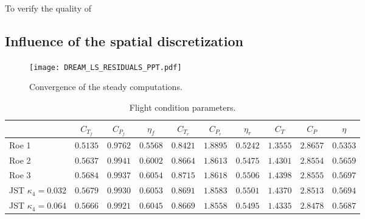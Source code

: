 To verify the quality of 

\subsection{Influence of the spatial discretization} %
\label{sub:dream_ls_spatial_discretization}

\begin{figure}[htb]
  \centering
  \texttt{[image: DREAM\_LS\_RESIDUALS\_PPT.pdf]}
  \caption{Convergence of the steady computations.}
  \label{fig:dream_operating_point}
\end{figure}

\begin{table}[htb]
   \centering
  \begin{tabular}{l|ccccccccc}
    \toprule
    \phantom{abdefghijk}& $C_{T_f}$ & $C_{P_f}$ & $\eta_f$ & $C_{T_r}$ & $C_{P_r}$ & $\eta_r$ & $C_T$ & $C_P$ & $\eta$ \\
    \midrule
    Roe 1 & $0.5135$ & $0.9762$ & $0.5568$ & $0.8421$ & $1.8895$ & $0.5242$ & $1.3555$ & $2.8657$ & $0.5353$ \\
    Roe 2 & $0.5637$ & $0.9941$ & $0.6002$ & $0.8664$ & $1.8613$ & $0.5475$ & $1.4301$ & $2.8554$ & $0.5659$ \\
    Roe 3 & $0.5684$ & $0.9937$ & $0.6054$ & $0.8715$ & $1.8618$ & $0.5506$ & $1.4398$ & $2.8555$ & $0.5697$ \\
    JST $\kappa_4 = 0.032$ & $0.5679$ & $0.9930$ & $0.6053$ & $0.8691$ & $1.8583$ & $0.5501$ & $1.4370$ & $2.8513$ & $0.5694$ \\
    JST $\kappa_4 = 0.064$ & $0.5666$ & $0.9921$ & $0.6045$ & $0.8669$ & $1.8558$ & $0.5495$ & $1.4335$ & $2.8478$ & $0.5687$ \\
    \bottomrule
  \end{tabular}
  \caption{Flight condition parameters.}
  \label{tab:dream_operating_point}
\end{table} 

